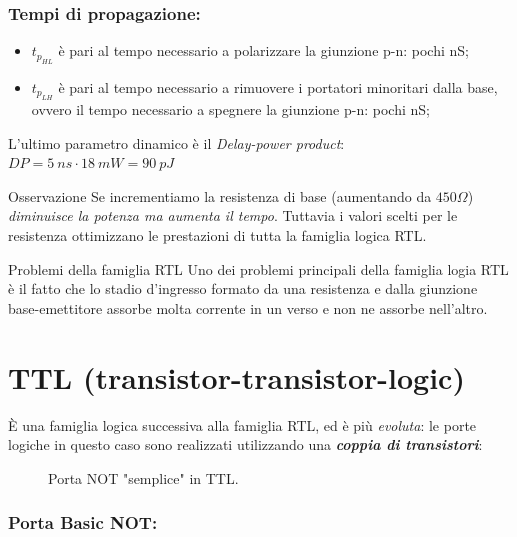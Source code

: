 \documentclass[
]{book}
\providecommand{\tightlist}{%
  \setlength{\itemsep}{0pt}\setlength{\parskip}{0pt}}
\begin{document}
\subsubsection{Tempi di propagazione:}\label{tempi-di-propagazione}

\begin{itemize}
\tightlist
\item
  \(t_{p_{HL}}\) è pari al tempo necessario a polarizzare la giunzione
  p-n: pochi nS;
\item
  \(t_{p_{LH}}\) è pari al tempo necessario a rimuovere i portatori
  minoritari dalla base, ovvero il tempo necessario a spegnere la
  giunzione p-n: pochi nS;
\end{itemize}

L'ultimo parametro dinamico è il \emph{Delay-power product}:
\(DP=5\:ns\cdot 18\:mW=90\:pJ\)

\begin{redbox}{Osservazione}
Se incrementiamo la resistenza di base (aumentando da $450\Omega$) \emph{diminuisce la potenza ma aumenta il tempo}.\newline
Tuttavia i valori scelti per le resistenza ottimizzano le prestazioni di tutta la famiglia logica RTL.
\end{redbox}
\begin{orangebox}{Problemi della famiglia RTL}
Uno dei problemi principali della famiglia logia RTL è il fatto che lo stadio d'ingresso formato da una resistenza e dalla giunzione base-emettitore assorbe molta corrente in un verso e non ne assorbe nell'altro.
\end{orangebox}

\section{TTL
(transistor-transistor-logic)}\label{ttl-transistor-transistor-logic}

È una famiglia logica successiva alla famiglia RTL, ed è più
\emph{evoluta}: le porte logiche in questo caso sono realizzati
utilizzando una \textbf{\emph{coppia di transistori}}:

\begin{figure}[H]
    \centering
    \resizebox{0.5\textwidth}{!}{}
    \caption{Porta NOT "semplice" in TTL.}
\end{figure}

\subsubsection{\texorpdfstring{Porta \textbf{Basic
NOT}:}{Porta Basic NOT:}}\label{porta-basic-not}
\end{document}
